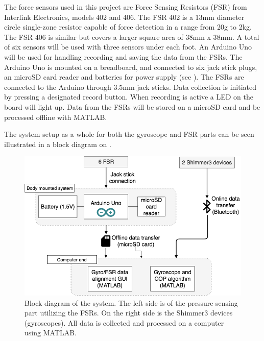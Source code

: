 The force sensors used in this project are Force Sensing Resistors (FSR) from Interlink Electronics, models 402 and 406. The FSR 402 is a 13mm diameter circle single-zone resistor capable of force detection in a range from 20g to 2kg. The FSR 406 is similar but covers a larger square area of 38mm x 38mm. \cite{IE400} A total of six sensors will be used with three sensors under each foot. 
An Arduino Uno will be used for handling recording and saving the data from the FSRs. The Arduino Uno is mounted on a breadboard, and connected to six jack stick plugs, an microSD card reader and batteries for power supply (see ). The FSRs are connected to the Arduino through 3.5mm jack sticks. Data collection is initiated by pressing a designated record button. When recording is active a LED on the board will light up. Data from the FSRs will be stored on a microSD card and be processed offline with MATLAB.


The system setup as a whole for both the gyroscope and FSR parts can be seen illustrated in a block diagram on .

\begin{figure}[H]
	\includegraphics[width=.6\textwidth]{figures/heleSystemSetup}
	\caption{Block diagram of the system. The left side is of the pressure sensing part utilizing the FSRs. On the right side is the Shimmer3 devices (gyroscopes). All data is collected and processed on a computer using MATLAB.}
	\label{fig:heleSystemSetup}  %
\end{figure}

